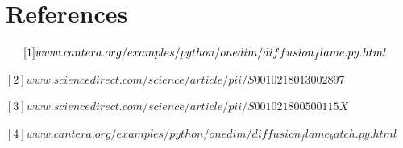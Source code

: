 \documentclass[a4paper]{article}
\newcommand{\sepspace}{\vspace*{1em}}
\begin{document}
\sepspace

\sepspace

\sepspace

\section{References}

$
\hspace{5,35mm}[1] 
www.cantera.org/examples/python/onedim/diffusion_flame.py.html
$

$
[2] www.sciencedirect.com/science/article/pii/S0010218013002897
$

$
[3] www.sciencedirect.com/science/article/pii/S001021800500115X
$

$
[4]
www.cantera.org/examples/python/onedim/diffusion_flame_batch.py.html
$
\end{document}
